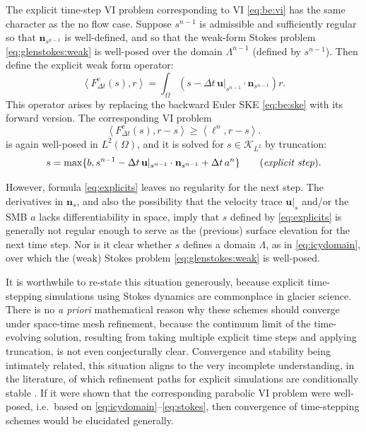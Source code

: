 \documentclass[hidelinks,onefignum,onetabnum,final]{siamart220329}  %
\newcommand{\bn}{\mathbf{n}}
\newcommand{\bu}{\mathbf{u}}
\newcommand{\cK}{\mathcal{K}}
\newcommand{\ip}[2]{\left<#1,#2\right>}
\begin{document}
The explicit time-step VI problem corresponding to VI \eqref{eq:be:vi} has the same character as the no flow case.  Suppose $s^{n-1}$ is admissible and sufficiently regular so that $\bn_{s^{n-1}}$ is well-defined, and so that the weak-form Stokes problem \eqref{eq:glenstokes:weak} is well-posed over the domain $\Lambda^{n-1}$ (defined by $s^{n-1}$).  Then define the explicit weak form operator:
\begin{equation}
\ip{F^{\text{e}}_{\Delta t}(s)}{r} = \int_\Omega \left(s - \Delta t\, \bu|_{s^{n-1}} \cdot \bn_{s^{n-1}}\right) r.  \label{eq:explicitFdefine}
\end{equation}
This operator arises by replacing the backward Euler SKE \eqref{eq:be:ske} with its forward version.  The corresponding VI problem
\begin{equation}
\ip{F^{\text{e}}_{\Delta t}(s)}{r-s} \ge \ip{\ell^n}{r-s}.
\end{equation}
is again well-posed in $L^2(\Omega)$, and it is solved for $s \in \cK_{L^2}$ by truncation:
\begin{equation}
s = \max\{b, s^{n-1} - \Delta t\, \bu|_{s^{n-1}} \cdot \bn_{s^{n-1}} + \Delta t\,a^n\} \qquad (\text{\emph{explicit step}}). \label{eq:explicits}
\end{equation}

However, formula \eqref{eq:explicits} leaves no regularity for the next step.  The derivatives in $\bn_{s}$, and also the possibility that the velocity trace $\bu|_{s}$ and/or the SMB $a$ lacks differentiability in space, imply that $s$ defined by \eqref{eq:explicits} is generally not regular enough to serve as the (previous) surface elevation for the next time step.  Nor is it clear whether $s$ defines a domain $\Lambda$, as in \eqref{eq:icydomain}, over which the (weak) Stokes problem \eqref{eq:glenstokes:weak} is well-posed.

It is worthwhile to re-state this situation generously, because explicit time-stepping simulations using Stokes dynamics are commonplace in glacier science.  There is no \emph{a priori} mathematical reason why these schemes should converge under space-time mesh refinement, because the continuum limit of the time-evolving solution, resulting from taking multiple explicit time steps and applying truncation, is not even conjecturally clear.  Convergence and stability being intimately related, this situation aligns to the very incomplete understanding, in the literature, of which refinement paths for explicit simulations are conditionally stable \cite[and references therein]{Bueler2023,Chengetal2017,LofgrenAhlkronaHelanow2022}.  If it were shown that the corresponding parabolic VI problem \cite{Glowinski1984} were well-posed, i.e.~based on \eqref{eq:icydomain}--\eqref{eq:stokes}, then convergence of time-stepping schemes would be elucidated generally.
\end{document}
